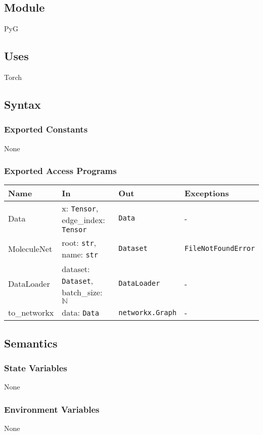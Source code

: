 \documentclass[12pt, titlepage]{article}
\begin{document}
\subsection{Module}
PyG

\subsection{Uses}
Torch

\subsection{Syntax}

\subsubsection{Exported Constants}
None

\subsubsection{Exported Access Programs}

\begin{center}
\begin{tabular}{p{3.2cm} >{\raggedright\arraybackslash}p{5.5cm} p{4cm} p{2.5cm}}
\hline
\textbf{Name} & \textbf{In} & \textbf{Out} & \textbf{Exceptions} \\
\hline
Data & x: \texttt{Tensor}, edge\_index: \texttt{Tensor} & \texttt{Data} & - \\
MoleculeNet & root: \texttt{str}, name: \texttt{str} & \texttt{Dataset} & \texttt{FileNotFoundError} \\
DataLoader & dataset: \texttt{Dataset}, batch\_size: \(\mathbb{N}\) & \texttt{DataLoader} & - \\
to\_networkx & data: \texttt{Data} & \texttt{networkx.Graph} & - \\
\hline
\end{tabular}
\end{center}

\subsection{Semantics}

\subsubsection{State Variables}
None

\subsubsection{Environment Variables}
None
\end{document}
